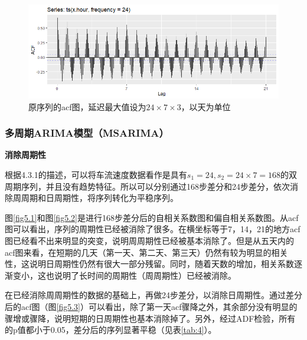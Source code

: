 \documentclass[lang=cn,11pt,a4paper]{elegantpaper}
\begin{document}
\begin{figure}[htbp]
  \centering
  \includegraphics[width=\textwidth]{image/acf_1.png}
  \caption{原序列的acf图，延迟最大值设为$24\times7\times3$，以天为单位}
  \label{fig4}
\end{figure}  

\subsubsection{多周期ARIMA模型（MSARIMA）}

\textbf{消除周期性}

根据4.3.1的描述，可以将车流速度数据看作是具有$s_1=24,s_2=24\times7=168$的双周期序列，并且没有趋势特征。所以可以分别通过168步差分和24步差分，依次消除周周期和日周期性，将序列转化为平稳序列。

图\ref{fig5.1}和图\ref{fig5.2}是进行168步差分后的自相关系数图和偏自相关系数图。从acf图可以看出，序列的周期性已经被消除了很多。在横坐标等于7，14，21的地方acf图已经看不出来明显的突变，说明周周期性已经被基本消除了。但是从五天内的acf图来看，在短期的几天（第一天、第二天、第三天）仍然有较为明显的相关性，这说明日周期性仍然有很大一部分残留。同时，随着天数的增加，相关系数逐渐变小，这也说明了长时间的周期性（周周期性）已经被消除。

在已经消除周周期性的数据的基础上，再做24步差分，以消除日周期性。通过差分后的acf图（图\ref{fig5.3}）可以看出，除了第一天acf骤降之外，其余部分没有明显的骤增或骤降，说明短期的日周期性也基本消除掉了。另外，经过ADF检验，所有的p值都小于0.05，差分后的序列显著平稳（见表\ref{tab:4}）。
\end{document}
